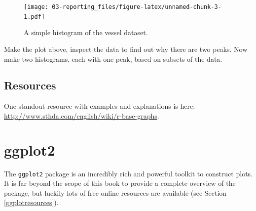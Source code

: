 \documentclass[]{book}
\newenvironment{Shaded}{\begin{snugshade}}{\end{snugshade}}
\newcommand{\CommentTok}[1]{\textcolor[rgb]{0.56,0.35,0.01}{\textit{#1}}}
\newcommand{\DataTypeTok}[1]{\textcolor[rgb]{0.13,0.29,0.53}{#1}}
\newcommand{\DecValTok}[1]{\textcolor[rgb]{0.00,0.00,0.81}{#1}}
\newcommand{\FloatTok}[1]{\textcolor[rgb]{0.00,0.00,0.81}{#1}}
\newcommand{\KeywordTok}[1]{\textcolor[rgb]{0.13,0.29,0.53}{\textbf{#1}}}
\newcommand{\NormalTok}[1]{#1}
\newcommand{\OperatorTok}[1]{\textcolor[rgb]{0.81,0.36,0.00}{\textbf{#1}}}
\newcommand{\StringTok}[1]{\textcolor[rgb]{0.31,0.60,0.02}{#1}}
\let\BeginKnitrBlock\begin \let\EndKnitrBlock\end
\begin{document}
\begin{Shaded}
\end{Shaded}

\begin{figure}
\centering
\texttt{[image: 03-reporting\_files/figure-latex/unnamed-chunk-3-1.pdf]}
\caption{\label{fig:unnamed-chunk-3}A simple histogram of the vessel dataset.}
\end{figure}

\BeginKnitrBlock{rmdtry}
Make the plot above, inspect the data to find out why there are two peaks. Now make two histograms, each with one peak, based on subsets of the data.
\EndKnitrBlock{rmdtry}

\hypertarget{resources}{%
\subsection{Resources}\label{resources}}

One standout resource with examples and explanations is here: \url{http://www.sthda.com/english/wiki/r-base-graphs}.

\hypertarget{ggplot2}{%
\section{ggplot2}\label{ggplot2}}

The \texttt{ggplot2} package is an incredibly rich and powerful toolkit to construct plots. It is far beyond the scope of this book to provide a complete overview of the package, but luckily lots of free online resources are available (see Section \ref{ggplotresources}).
\end{document}
